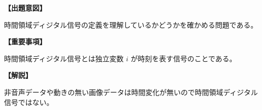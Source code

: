 \noindent \textbf{【出題意図】}

\noindent 時間領域ディジタル信号の定義を理解しているかどうかを確かめる問題である。

\vspace{1em}
\noindent \textbf{【重要事項】}

\medskip
\noindent 時間領域ディジタル信号とは独立変数 $i$ が時刻を表す信号のことである。

\vspace{1em}
\noindent \textbf{【解説】}

\noindent 非音声データや動きの無い画像データは時間変化が無いので時間領域ディジタル信号ではない。

